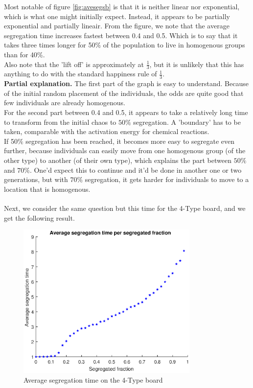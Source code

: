 \documentclass{article}
\begin{document}
Most notable of figure \ref{fig:avesegsb} is that it is neither linear nor exponential, which is what one might initially expect. Instead, it appears to be partially exponential and partially lineair. From the figure, we note that the average segregation time increases fastest between 0.4 and 0.5. 
Which is to say that it takes three times longer for 50\% of the population to live in homogenous groups than for 40\%.\\
Also note that the 'lift off' is approximately at $\frac{1}{3}$, but it is unlikely that this has anything to do with the standard happiness rule of $\frac{1}{3}$.\\
\textbf{Partial explanation.} The first part of the graph is easy to understand. Because of the initial random placement of the individuals, the odds are quite good that few individuals are already homogenous.\\
For the second part between 0.4 and 0.5, it appears to take a relatively long time to transform from the initial chaos to $50\%$ segregation. A 'boundary' has to be taken, comparable with the activation energy for chemical reactions.\\
If 50$\%$ segregation has been reached, it becomes more easy to segregate even further, because individuals can easily move from one homogenous group (of the other type) to another (of their own type), which explains the part between $50\%$ and $70\%$. One'd expect this to continue and it'd be done in another one or two generations, but with $70\%$ segregation, it gets harder for individuals to move to a location that is homogenous.\\
\\
Next, we consider the same question but this time for the 4-Type board, and we get the following result.


 \begin{figure}[H]
    \centering
    \includegraphics[width=0.8\textwidth]{aveseg_4b_1}
    \caption{Average segregation time on the 4-Type board}
    \label{fig:aveseg4b}
\end{figure}
\end{document}
